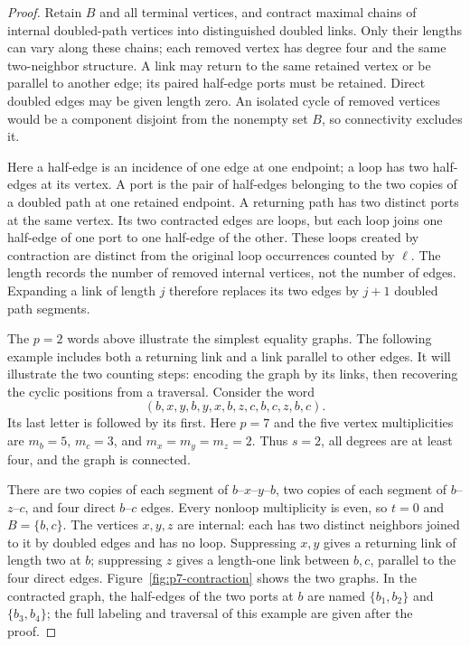 \documentclass[11pt]{article}
\theoremstyle{definition}
\theoremstyle{remark}
\theoremstyle{plain}
\begin{document}
\begin{proof}
Retain \(B\) and all terminal vertices, and contract maximal chains
of internal doubled-path vertices into distinguished doubled links.
Only their lengths can vary along these chains; each removed vertex
has degree four and the same two-neighbor structure.
A link may return to the same retained vertex or be parallel to
another edge; its paired half-edge ports must be retained.
Direct doubled edges may be given length zero. An isolated cycle
of removed vertices would be a component disjoint from the nonempty
set $B$, so connectivity excludes it.

Here a half-edge is an incidence of one edge at one endpoint;
a loop has two half-edges at its vertex. A port is the pair of
half-edges belonging to the two copies of a doubled path at one
retained endpoint. A returning path has two distinct ports at the
same vertex. Its two contracted edges are loops, but each loop
joins one half-edge of one port to one half-edge of the other.
These loops created by contraction are distinct from the original
loop occurrences counted by $\ell$.
The length records the number of removed internal vertices,
not the number of edges. Expanding a link of length $j$ therefore
replaces its two edges by $j+1$ doubled path segments.

The $p=2$ words above illustrate the simplest equality graphs.
The following example includes both a returning link and a link
parallel to other edges. It will illustrate the two counting steps:
encoding the graph by its links, then recovering the cyclic positions
from a traversal. Consider the word
\begin{equation}\label{eq:encoding-example-word}
 (b,x,y,b,y,x,b,z,c,b,c,z,b,c).
\end{equation}
Its last letter is followed by its first. Here $p=7$ and the five
vertex multiplicities are $m_b=5$, $m_c=3$, and
$m_x=m_y=m_z=2$. Thus $s=2$, all degrees are at least four, and
the graph is connected.

There are two copies of each segment of
$b$--$x$--$y$--$b$, two copies of each segment of
$b$--$z$--$c$, and four direct $b$--$c$ edges. Every nonloop
multiplicity is even, so $t=0$ and $B=\{b,c\}$.
The vertices $x,y,z$ are internal: each has two distinct neighbors
joined to it by doubled edges and has no loop.
Suppressing $x,y$ gives a returning link of length two at $b$;
suppressing $z$ gives a length-one link between $b,c$, parallel to
the four direct edges. Figure~\ref{fig:p7-contraction} shows the two
graphs. In the contracted graph, the half-edges of the two ports at
$b$ are named $\{b_1,b_2\}$ and $\{b_3,b_4\}$; the full labeling
and traversal of this example are given after the proof.


\end{proof}
\end{document}
